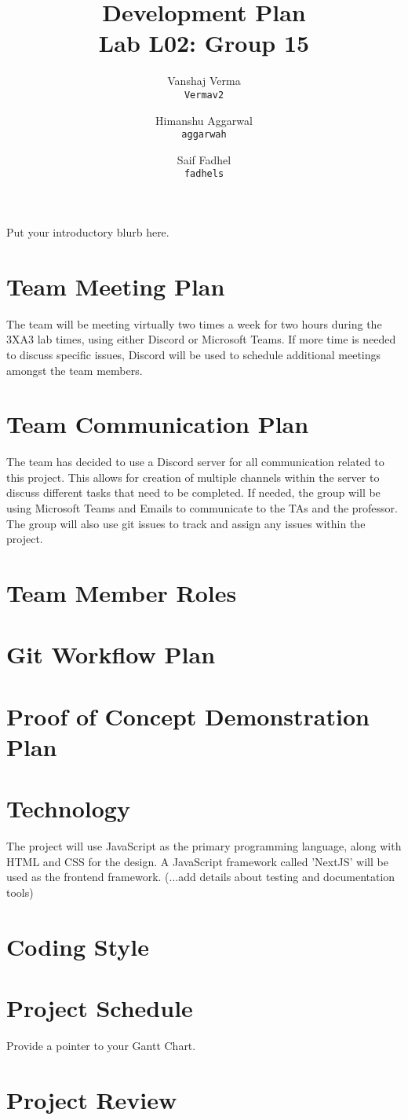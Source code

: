\documentclass[12pt,fleqn]{article}
\title{\vspace*{150pt}Development Plan\\\vspace{10pt}Lab L02: Group 15}
\author{
Vanshaj Verma\\
    \texttt{Vermav2}	
	\\
\and 
Himanshu Aggarwal\\
	\texttt{aggarwah}
	\\
\and
Saif Fadhel\\
  	\texttt{fadhels}
  	\\
}
\date{\submissionDate{}}
\begin{document}
\maketitle
\thispagestyle{empty}
\pagebreak

Put your introductory blurb here.

\section{Team Meeting Plan}
\noindent The team will be meeting virtually two times a week for two hours during the 3XA3 lab times, using either Discord or Microsoft Teams. If more time is needed to discuss specific issues, Discord will be used to schedule additional meetings amongst the team members.

\section{Team Communication Plan}
\noindent The team has decided to use a Discord server for all communication related to this project. This allows for creation of multiple channels within the server to discuss different tasks that need to be completed. If needed, the group will be using Microsoft Teams and Emails to communicate to the TAs and the professor. The group will also use git issues to track and assign any issues within the project. 

\section{Team Member Roles}


\section{Git Workflow Plan}

\section{Proof of Concept Demonstration Plan}

\section{Technology}
\noindent The project will use JavaScript as the primary programming language, along with HTML and CSS for the design. A JavaScript framework called 'NextJS' will be used as the frontend framework. (...add details about testing and documentation tools)

\section{Coding Style}

\section{Project Schedule}

Provide a pointer to your Gantt Chart.

\section{Project Review}


 
\end{document}
